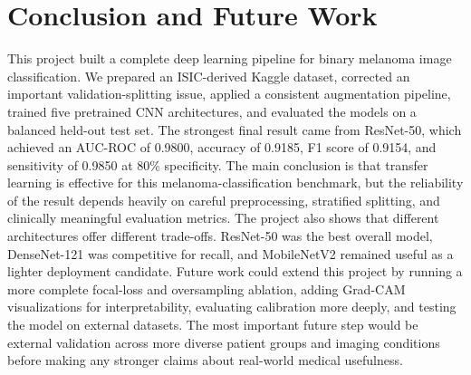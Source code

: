 \documentclass{article}
\begin{document}
\section{Conclusion and Future Work}
This project built a complete deep learning pipeline for binary melanoma image classification. We
prepared an ISIC-derived Kaggle dataset, corrected an important validation-splitting issue, applied
a consistent augmentation pipeline, trained five pretrained CNN architectures, and evaluated the
models on a balanced held-out test set. The strongest final result came from ResNet-50, which
achieved an AUC-ROC of 0.9800, accuracy of 0.9185, F1 score of 0.9154, and sensitivity of 0.9850
at 80\% specificity.
The main conclusion is that transfer learning is effective for this melanoma-classification benchmark,
but the reliability of the result depends heavily on careful preprocessing, stratified splitting, and
clinically meaningful evaluation metrics. The project also shows that different architectures offer
different trade-offs. ResNet-50 was the best overall model, DenseNet-121 was competitive for recall,
and MobileNetV2 remained useful as a lighter deployment candidate.
Future work could extend this project by running a more complete focal-loss and oversampling
ablation, adding Grad-CAM visualizations for interpretability, evaluating calibration more deeply,
and testing the model on external datasets. The most important future step would be external
validation across more diverse patient groups and imaging conditions before making any stronger
claims about real-world medical usefulness.
\end{document}
